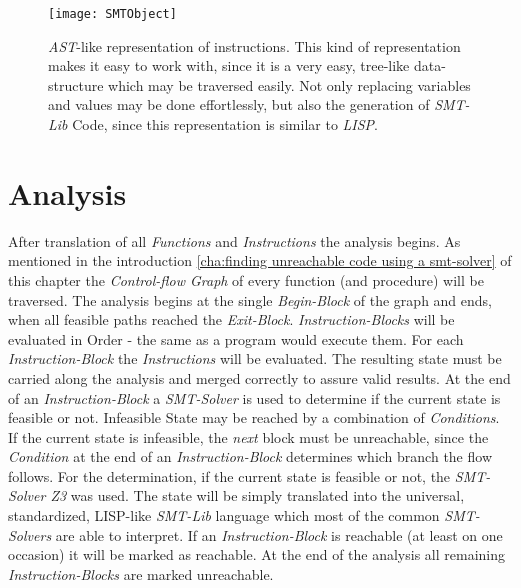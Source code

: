 \begin{figure}[h!]
	\centering
	\texttt{[image: SMTObject]}
	\caption{\emph{AST}-like representation of instructions. This kind of representation makes it easy to work with, since it is a very easy, tree-like data-structure which may be traversed easily. Not only replacing variables and values may be done effortlessly, but also the generation of \emph{SMT-Lib} Code, since this representation is similar to \emph{LISP}.}
	\label{fig:smtobject}
\end{figure}
\section{Analysis}
\label{sec:analysis}
After translation of all \emph{Functions} and \emph{Instructions} the analysis begins. As mentioned in the introduction \ref{cha:finding unreachable code using a smt-solver} of this chapter the \emph{Control-flow Graph} of every function (and procedure) will be traversed. The analysis begins at the single \emph{Begin-Block} of the graph and ends, when all feasible paths reached the \emph{Exit-Block}. \emph{Instruction-Blocks} will be evaluated in Order - the same as a program would execute them. 
For each \emph{Instruction-Block} the \emph{Instructions} will be evaluated. The resulting state must be carried along the analysis and merged correctly to assure valid results. At the end of an \emph{Instruction-Block} a \emph{SMT-Solver} is used to determine if the current state is feasible or not. Infeasible State may be reached by a combination of \emph{Conditions}. If the current state is infeasible, the \emph{next} block must be unreachable, since the \emph{Condition} at the end of an \emph{Instruction-Block} determines which branch the flow follows. 
For the determination, if the current state is feasible or not, the \emph{SMT-Solver Z3}\cite{demouraZ3EfficientSMT2008} was used. The state will be simply translated into the universal, standardized, LISP-like \emph{SMT-Lib} language which most of the common \emph{SMT-Solvers} are able to interpret. 
If an \emph{Instruction-Block} is reachable (at least on one occasion) it will be marked as reachable. At the end of the analysis all remaining \emph{Instruction-Blocks} are marked unreachable.
